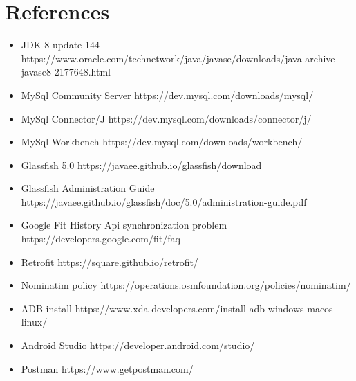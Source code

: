 \section{References}

\begin{itemize}
\item JDK 8 update 144 https://www.oracle.com/technetwork/java/javase/downloads/java-archive-javase8-2177648.html
\item MySql Community Server https://dev.mysql.com/downloads/mysql/
\item MySql Connector/J https://dev.mysql.com/downloads/connector/j/
\item MySql Workbench https://dev.mysql.com/downloads/workbench/
\item Glassfish 5.0 https://javaee.github.io/glassfish/download
\item Glassfish Administration Guide https://javaee.github.io/glassfish/doc/5.0/administration-guide.pdf
\item Google Fit History Api synchronization problem https://developers.google.com/fit/faq
\item Retrofit https://square.github.io/retrofit/
\item Nominatim policy https://operations.osmfoundation.org/policies/nominatim/
\item ADB install https://www.xda-developers.com/install-adb-windows-macos-linux/
\item Android Studio https://developer.android.com/studio/
\item Postman https://www.getpostman.com/
\end{itemize}
